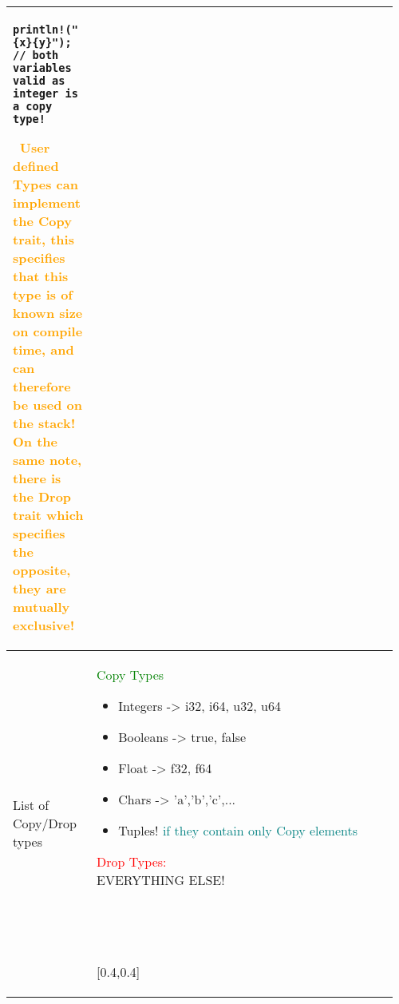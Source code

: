 \documentclass[main.tex,fontsize=8pt,paper=a4,paper=portrait,DIV=calc,]{scrartcl}
\begin{document}
\begin{table}[ht!]
\begin{tabular}{|m{0.2\linewidth}|m{0.755\linewidth}|}
\begin{lstlisting}
println!("{x}{y}"); // both variables valid as integer is a copy type!
\end{lstlisting}
\, \newline
\textcolor{orange}{User defined Types can implement the \textbf{Copy} trait, this specifies that this type is of known size on compile time, and can therefore be used on the stack!}\newline
\textcolor{orange}{On the same note, there is the \textbf{Drop} trait which specifies the opposite, they are \textbf{mutually exclusive}!}\\
\hline
List of Copy/Drop types & \minipg{
\textcolor{green}{Copy Types}\newline
\begin{itemize}
\item Integers -> i32, i64, u32, u64
\item Booleans -> true, false
\item Float -> f32, f64
\item Chars -> 'a','b','c',...
\item Tuples! \textcolor{teal}{if they contain only Copy elements}
\end{itemize}}
{\textcolor{red}{Drop Types:}\newline
EVERYTHING ELSE!\newline
\, \newline
\, \newline
\, \newline
\, \newline
}[0.4,0.4]\\ 
\hline
\end{tabular}
\end{table}
\pagebreak 
\end{document}
